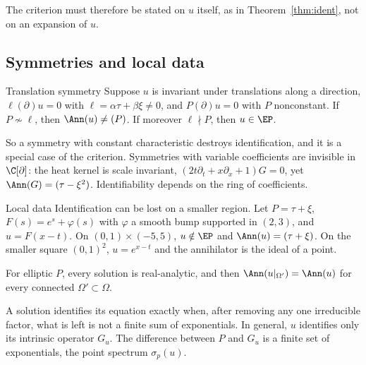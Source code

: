 The criterion must therefore be stated on $u$ itself, as in Theorem~\ref{thm:ident}, not on an expansion of $u$.

\subsection{Symmetries and local data}

\begin{proposition}{Translation symmetry  \pw}\label{prop:sym}
Suppose $u$ is invariant under translations along a direction, $\ell(\partial)u=0$ with $\ell=\alpha\tau+\beta\xi\ne0$, and $P(\partial)u=0$ with $P$ nonconstant. If $P\not\sim\ell$, then $\Ann(u)\ne(P)$. If moreover $\ell\nmid P$, then $u\in\EP$.

\end{proposition}

So a symmetry with constant characteristic destroys identification, and it is a special case of the criterion. Symmetries with variable coefficients are invisible in $\C[\partial]$: the heat kernel is scale invariant, $(2t\partial_t+x\partial_x+1)G=0$, yet $\Ann(G)=(\tau-\xi^2)$. Identifiability depends on the ring of coefficients.

\begin{proposition}{Local data  \pw}\label{prop:local}
Identification can be lost on a smaller region. Let $P=\tau+\xi$, $F(s)=e^s+\varphi(s)$ with $\varphi$ a smooth bump supported in $(2,3)$, and $u=F(x-t)$. On $(0,1)\times(-5,5)$, $u\notin\EP$ and $\Ann(u)=(\tau+\xi)$. On the smaller square $(0,1)^2$, $u=e^{x-t}$ and the annihilator is the ideal of a point.

For elliptic $P$, every solution is real-analytic, and then $\Ann(u|_{\Omega'})=\Ann(u)$ for every connected $\Omega'\subset\Omega$.

\end{proposition}

\begin{keypoint}
A solution identifies its equation exactly when, after removing any one irreducible factor, what is left is not a finite sum of exponentials. In general, $u$ identifies only its intrinsic operator $G_u$. The difference between $P$ and $G_u$ is a finite set of exponentials, the point spectrum $\sigma_p(u)$.
\end{keypoint}
